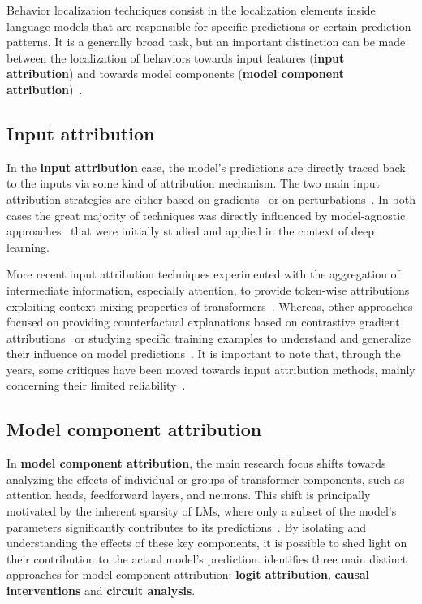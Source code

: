 Behavior localization techniques consist in the localization elements inside language models that are responsible for specific predictions or certain prediction patterns.
It is a generally broad task, but an important distinction can be made between the localization of behaviors towards input features (\textbf{input attribution}) and towards model components (\textbf{model component attribution})~\cite{ferrando2024}. 

\subsection{Input attribution}

In the \textbf{input attribution} case, the model's predictions are directly traced back to the inputs via some kind of attribution mechanism.
The two main input attribution strategies are either based on gradients~\cite{denil2014, ding2021, sanyal2021} or on perturbations~\cite{li2016, amara2024, mohebbi2023}.
In both cases the great majority of techniques was directly influenced by model-agnostic approaches~\cite{sundararajan2017, smilkov2017, ribeiro2016, lundberg2017} that were initially studied and applied in the context of deep learning.

More recent input attribution techniques experimented with the aggregation of intermediate information, especially attention, to provide token-wise attributions exploiting context mixing properties of transformers~\cite{ferrando2022, modarressi2022, mohebbi2023}.
Whereas, other approaches focused on providing counterfactual explanations based on contrastive gradient attributions~\cite{yin2022} or studying specific training examples to understand and generalize their influence on model predictions~\cite{grosse2023}.
It is important to note that, through the years, some critiques have been moved towards input attribution methods, mainly concerning their limited reliability~\cite{sixt2019, adebayo2018, atanasova2020}.

\subsection{Model component attribution}

In \textbf{model component attribution}, the main research focus shifts towards analyzing the effects of individual or groups of transformer components, such as attention heads, feedforward layers, and neurons.
This shift is principally motivated by the inherent sparsity of LMs, where only a subset of the model's parameters significantly contributes to its predictions~\cite{zhao2021}.
By isolating and understanding the effects of these key components, it is possible to shed light on their contribution to the actual model's prediction.
\citet{ferrando2024} identifies three main distinct approaches for model component attribution: \textbf{logit attribution}, \textbf{causal interventions} and \textbf{circuit analysis}.

